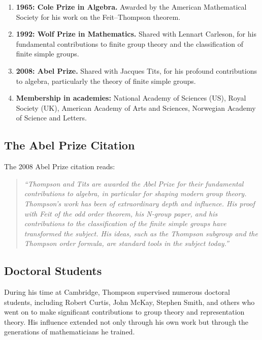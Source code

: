 \begin{enumerate}
\item \textbf{1965: Cole Prize in Algebra.} Awarded by the American Mathematical Society for his work on the Feit--Thompson theorem.

\item \textbf{1992: Wolf Prize in Mathematics.} Shared with Lennart Carleson, for his fundamental contributions to finite group theory and the classification of finite simple groups.

\item \textbf{2008: Abel Prize.} Shared with Jacques Tits, for his profound contributions to algebra, particularly the theory of finite simple groups.

\item \textbf{Membership in academies:} National Academy of Sciences (US), Royal Society (UK), American Academy of Arts and Sciences, Norwegian Academy of Science and Letters.
\end{enumerate}

\subsection{The Abel Prize Citation}

The 2008 Abel Prize citation reads:

\begin{quote}
\it ``Thompson and Tits are awarded the Abel Prize for their fundamental contributions to algebra, in particular for shaping modern group theory. Thompson's work has been of extraordinary depth and influence. His proof with Feit of the odd order theorem, his N-group paper, and his contributions to the classification of the finite simple groups have transformed the subject. His ideas, such as the Thompson subgroup and the Thompson order formula, are standard tools in the subject today.''
\end{quote}

\subsection{Doctoral Students}

During his time at Cambridge, Thompson supervised numerous doctoral students, including Robert Curtis, John McKay, Stephen Smith, and others who went on to make significant contributions to group theory and representation theory. His influence extended not only through his own work but through the generations of mathematicians he trained.


